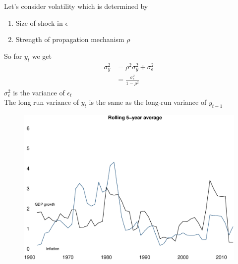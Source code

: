 \documentclass{beamer}
\begin{document}
\begin{frame}
  Let's consider volatility which is determined by
  \begin{enumerate}
    \item Size of shock in $\epsilon$
    \item Strength of propagation mechanism $\rho$
  \end{enumerate}
  \medskip
  So for $y_t$ we get 
  \begin{align}
  \sigma_y^2 &= \rho^2 \sigma_y^2 + \sigma_\epsilon^2\\ \nonumber
  &= \frac{\sigma_\epsilon^2}{1-\rho^2}
\end{align}
\medskip
$\sigma_\epsilon^2$ is the variance of $\epsilon_t$\\
The long run variance of $y_t$ is the same as the long-run variance of $y_{t-1}$  
\end{frame}

\begin{frame}
  \begin{figure}
    \includegraphics[scale=.3]{great_moderation.eps}
  \end{figure}
\end{frame}
\end{document}
